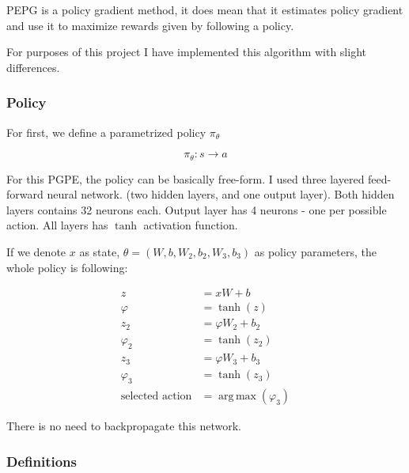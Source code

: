 \documentclass[12pt]{article}
\DeclareMathOperator*{\argmax}{arg\,max}
\begin{document}
PEPG is a policy gradient method, it does mean that it estimates policy gradient and use it to maximize rewards given by following a policy.

For purposes of this project I have implemented this algorithm with slight differences.

\subsubsection{Policy}

For first, we define a parametrized policy $\pi_\theta$

\begin{equation}
\pi_\theta: s \rightarrow a
\end{equation}

For this PGPE, the policy can be basically free-form. I used three layered feed-forward neural network. (two hidden layers, and one output layer).
Both hidden layers contains 32 neurons each. Output layer has 4 neurons - one per possible action. All layers has $\tanh$ activation function.

If we denote $x$ as state, $\theta = (W,b,W_2,b_2,W_3, b_3)$ as policy parameters, the whole policy is following:

\begin{equation}
\begin{aligned}
z &= xW + b \\
\varphi &= \tanh(z) \\
z_2 &= \varphi W_2 + b_2 \\
\varphi_2 &= \tanh(z_2) \\
z_3 &= \varphi W_3 + b_3 \\
\varphi_3 &= \tanh(z_3) \\
\text{selected action} &= \argmax(\varphi_3)
\end{aligned}
\end{equation}

There is no need to backpropagate this network.

\subsubsection{Definitions}
\end{document}
